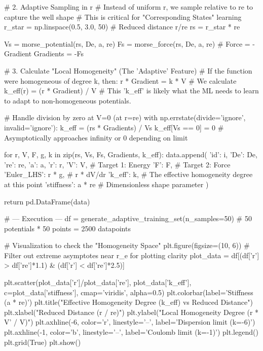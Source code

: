         # 2. Adaptive Sampling in r
        # Instead of uniform r, we sample relative to re to capture the well shape
        # This is critical for "Corresponding States" learning
        r_star = np.linspace(0.5, 3.0, 50) # Reduced distance r/re
        rs = r_star * re
        
        Vs = morse_potential(rs, De, a, re)
        Fs = morse_force(rs, De, a, re) # Force = -Gradient
        Gradients = -Fs 

        # 3. Calculate "Local Homogeneity" (The 'Adaptive' Feature)
        # If the function were homogeneous of degree k, then: r * Gradient = k * V
        # We calculate k_eff(r) = (r * Gradient) / V
        # This 'k_eff' is likely what the ML needs to learn to adapt to non-homogeneous potentials.
        
        # Handle division by zero at V=0 (at r=re)
        with np.errstate(divide='ignore', invalid='ignore'):
            k_eff = (rs * Gradients) / Vs
            k_eff[Vs == 0] = 0 # Asymptotically approaches infinity or 0 depending on limit
            
        for r, V, F, g, k in zip(rs, Vs, Fs, Gradients, k_eff):
            data.append({
                'id': i,
                'De': De,
                're': re,
                'a': a,
                'r': r,
                'V': V,          # Target 1: Energy
                'F': F,          # Target 2: Force
                'Euler_LHS': r * g,      # r * dV/dr
                'k_eff': k,      # The effective homogeneity degree at this point
                'stiffness': a * re # Dimensionless shape parameter
            })

    return pd.DataFrame(data)

# --- Execution ---
df = generate_adaptive_training_set(n_samples=50) # 50 potentials * 50 points = 2500 datapoints

# Visualization to check the "Homogeneity Space"
plt.figure(figsize=(10, 6))
# Filter out extreme asymptotes near r_e for plotting clarity
plot_data = df[(df['r'] > df['re']*1.1) & (df['r'] < df['re']*2.5)]

plt.scatter(plot_data['r']/plot_data['re'], plot_data['k_eff'], c=plot_data['stiffness'], cmap='viridis', alpha=0.5)
plt.colorbar(label='Stiffness (a * re)')
plt.title("Effective Homogeneity Degree (k_eff) vs Reduced Distance")
plt.xlabel("Reduced Distance (r / re)")
plt.ylabel("Local Homogeneity Degree (r * V' / V)")
plt.axhline(-6, color='r', linestyle='--', label='Dispersion limit (k=-6)')
plt.axhline(-1, color='b', linestyle='--', label='Coulomb limit (k=-1)')
plt.legend()
plt.grid(True)
plt.show()

